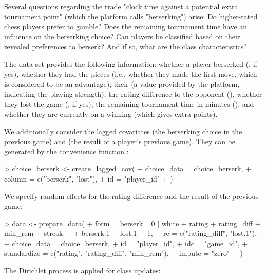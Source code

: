 \documentclass[article,shortnames]{jss}
\newcommand{\fct}[1]{\code{#1()}}
\begin{document}
Several questions regarding the trade "clock time against a potential extra tournament point" (which the platform calls "berserking") arise: Do higher-rated chess players prefer to gamble? Does the remaining tournament time have an influence on the berserking choice? Can players be classified based on their revealed preferences to berserk? And if so, what are the class characteristics?

The  data set provides the following information: whether a player berserked (, if yes), whether they had the  pieces (i.e., whether they made the first move, which is considered to be an advantage), their  (a value provided by the platform, indicating the playing strength), the rating difference to the opponent (), whether they lost the game (, if yes), the remaining tournament time in minutes (), and whether they are currently on a winning  (which gives extra points).

We additionally consider the lagged covariates  (the berserking choice in the previous game) and  (the result of a player's previous game). They can be generated by the convenience function \fct{create\_lagged\_cov}:

\begin{Schunk}
\begin{Sinput}
> choice_berserk <- create_lagged_cov(
+    choice_data = choice_berserk,
+    column = c("berserk", "lost"),
+    id = "player_id"
+  )
\end{Sinput}
\end{Schunk}

We specify random effects for the rating difference and the result of the previous game:

\begin{Schunk}
\begin{Sinput}
> data <- prepare_data(
+    form = berserk ~ 0 | white + rating + rating_diff + min_rem + streak +
+      berserk.1 + lost.1 + 1,
+    re = c("rating_diff", "lost.1"),
+    choice_data = choice_berserk,
+    id = "player_id",
+    idc = "game_id",
+    standardize = c("rating", "rating_diff", "min_rem"),
+    impute = "zero"
+  )
\end{Sinput}
\end{Schunk}

\newpage

The Dirichlet process is applied for class updates:
\end{document}
